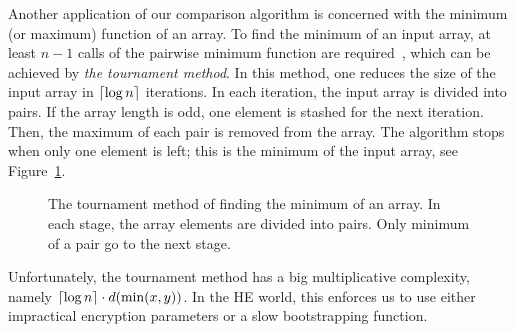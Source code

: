 	Another application of our comparison algorithm is concerned with the minimum (or maximum) function of an array.
	To find the minimum of an input array, at least $n-1$ calls of the pairwise minimum function are required~\cite[Chapter 9]{CLR09}, which can be achieved by \emph{the tournament method}.
	In this method, one reduces the size of the input array in $\left\lceil \log n \right\rceil$ iterations.
	In each iteration, the input array is divided into pairs. 
	If the array length is odd, one element is stashed for the next iteration. 
	Then, the maximum of each pair is removed from the array.
	The algorithm stops when only one element is left; this is the minimum of the input array, see Figure~\ref{fig:minimum_tournament}. 
	\begin{figure}
		\centering
		\caption{The tournament method of finding the minimum of an array. In each stage, the array elements are divided into pairs. Only minimum of a pair go to the next stage.}
		\label{fig:minimum_tournament}
	\end{figure}
	Unfortunately, the tournament method has a big multiplicative complexity, namely $\left\lceil \log n \right\rceil \cdot d(\min(x,y))$.
	In the HE world, this enforces us to use either impractical encryption parameters or a slow bootstrapping function.

